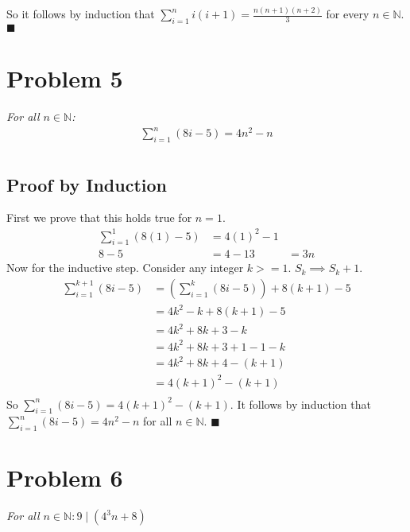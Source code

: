 \documentclass{article}
\newcommand*{\QEDA}{\hfill\ensuremath{\blacksquare}}%
\begin{document}
		So it follows by induction that $\sum_{i=1}^{n} i(i + 1) = \frac{n(n + 1)(n + 2)}{3}$ for every $n \in \mathbb{N}$. \QEDA
		
	\section{Problem 5} \textit{For all $n \in \mathbb{N}$:} 
	\begin{align*}
	\sum_{i=1}^{n} (8i - 5) = 4n^2 - n\\
	\end{align*}
		\subsection{Proof by Induction} First we prove that this holds true for $n = 1$.
		\begin{align*}
		\sum_{i=1}^{1} (8(1) - 5) &= 4(1)^2 - 1\\
		8 - 5 &= 4 - 1
		3 &= 3n
		\end{align*}
		Now for the inductive step. Consider any integer $k >= 1$. $S_k \implies S_k + 1$.
		\begin{align*}
		\sum_{i=1}^{k + 1} (8i - 5) &= (\sum_{i=1}^{k} (8i - 5)) + 8(k + 1) - 5\\
		&= 4k^2 - k + 8(k + 1) -5\\
		&= 4k^2 + 8k + 3 - k\\
		&= 4k^2 + 8k + 3 + 1 - 1 - k\\
		&= 4k^2 + 8k + 4 - (k + 1)\\
		&= 4(k + 1)^2 - (k + 1)\\
		\end{align*}
		So $\sum_{i=1}^{n} (8i - 5) = 4(k + 1)^2 - (k + 1)$. It follows by induction
		that $\sum_{i=1}^{n} (8i - 5) = 4n^2 - n$ for all $n \in \mathbb{N}$. \QEDA
		
    	\section{Problem 6} \textit{For all $n \in \mathbb{N}: 9 \mid (4^3n + 8)$}
\end{document}

